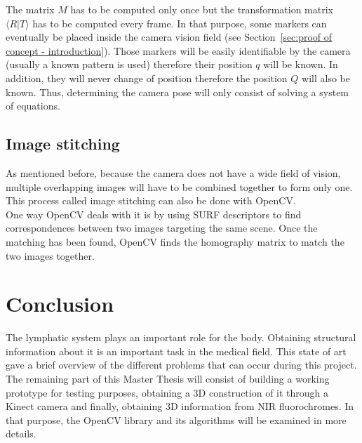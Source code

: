 The matrix $M$ has to be computed only once but the transformation matrix $\langle R\vert T\rangle$ has to be computed every frame. In that purpose, some markers can eventually be placed inside the camera vision field (see Section~\ref{sec:proof of concept - introduction}). Those markers will be easily identifiable by the camera (usually a known pattern is used) therefore their position $q$ will be known. In addition, they will never change of position therefore the position $Q$ will also be known. Thus, determining the camera pose will only consist of solving a system of equations.

\subsection{Image stitching}

As mentioned before, because the camera does not have a wide field of vision, multiple overlapping images will have to be combined together to form only one. This process called image stitching can also be done with OpenCV.\\

One way OpenCV deals with it is by using SURF descriptors \cite{bay_surf:_2006} to find correspondences between two images targeting the same scene. Once the matching has been found, OpenCV finds the homography matrix to match the two images together. 

\section{Conclusion}

The lymphatic system plays an important role for the body. Obtaining structural information about it is an important task in the medical field. This state of art gave a brief overview of the different problems that can occur during this project. The remaining part of this Master Thesis will consist of building a working prototype for testing purposes, obtaining a 3D construction of it through a Kinect camera and finally, obtaining 3D information from NIR fluorochromes. In that purpose, the OpenCV library and its algorithms will be examined in more details.
